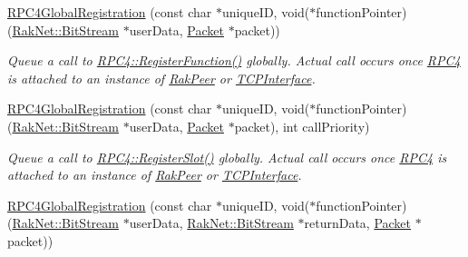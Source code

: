 \begin{DoxyCompactItemize}
\item 
\hypertarget{class_rak_net_1_1_r_p_c4_global_registration_a6d5f662a81ff75bfcb958c6c670ccd54}{\hyperlink{class_rak_net_1_1_r_p_c4_global_registration_a6d5f662a81ff75bfcb958c6c670ccd54}{R\-P\-C4\-Global\-Registration} (const char $\ast$unique\-I\-D, void($\ast$function\-Pointer)(\hyperlink{class_rak_net_1_1_bit_stream}{Rak\-Net\-::\-Bit\-Stream} $\ast$user\-Data, \hyperlink{struct_rak_net_1_1_packet}{Packet} $\ast$packet))}\label{class_rak_net_1_1_r_p_c4_global_registration_a6d5f662a81ff75bfcb958c6c670ccd54}

\begin{DoxyCompactList}\small\item\em Queue a call to \hyperlink{class_rak_net_1_1_r_p_c4_a62122f90344dbfc064f9b14e0f565b23}{R\-P\-C4\-::\-Register\-Function()} globally. Actual call occurs once \hyperlink{class_rak_net_1_1_r_p_c4}{R\-P\-C4} is attached to an instance of \hyperlink{class_rak_net_1_1_rak_peer}{Rak\-Peer} or \hyperlink{class_rak_net_1_1_t_c_p_interface}{T\-C\-P\-Interface}. \end{DoxyCompactList}\item 
\hypertarget{class_rak_net_1_1_r_p_c4_global_registration_aca6185838711ac942cb97e014c258f03}{\hyperlink{class_rak_net_1_1_r_p_c4_global_registration_aca6185838711ac942cb97e014c258f03}{R\-P\-C4\-Global\-Registration} (const char $\ast$unique\-I\-D, void($\ast$function\-Pointer)(\hyperlink{class_rak_net_1_1_bit_stream}{Rak\-Net\-::\-Bit\-Stream} $\ast$user\-Data, \hyperlink{struct_rak_net_1_1_packet}{Packet} $\ast$packet), int call\-Priority)}\label{class_rak_net_1_1_r_p_c4_global_registration_aca6185838711ac942cb97e014c258f03}

\begin{DoxyCompactList}\small\item\em Queue a call to \hyperlink{class_rak_net_1_1_r_p_c4_a923fe77794363d8ec6094da98fd40d03}{R\-P\-C4\-::\-Register\-Slot()} globally. Actual call occurs once \hyperlink{class_rak_net_1_1_r_p_c4}{R\-P\-C4} is attached to an instance of \hyperlink{class_rak_net_1_1_rak_peer}{Rak\-Peer} or \hyperlink{class_rak_net_1_1_t_c_p_interface}{T\-C\-P\-Interface}. \end{DoxyCompactList}\item 
\hypertarget{class_rak_net_1_1_r_p_c4_global_registration_a286b2b786c333952646bdc8ecf847486}{\hyperlink{class_rak_net_1_1_r_p_c4_global_registration_a286b2b786c333952646bdc8ecf847486}{R\-P\-C4\-Global\-Registration} (const char $\ast$unique\-I\-D, void($\ast$function\-Pointer)(\hyperlink{class_rak_net_1_1_bit_stream}{Rak\-Net\-::\-Bit\-Stream} $\ast$user\-Data, \hyperlink{class_rak_net_1_1_bit_stream}{Rak\-Net\-::\-Bit\-Stream} $\ast$return\-Data, \hyperlink{struct_rak_net_1_1_packet}{Packet} $\ast$packet))}\label{class_rak_net_1_1_r_p_c4_global_registration_a286b2b786c333952646bdc8ecf847486}


\end{DoxyCompactItemize}
